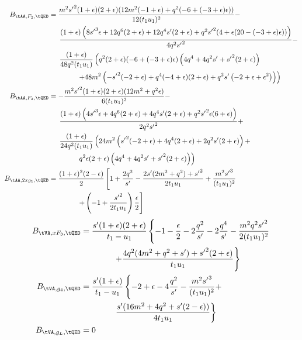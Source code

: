 \begin{align}
B_{\tAA,F_2,\tQED} &= \frac{{m^2} {s'}^2 (1+\epsilon ) (2+\epsilon ) (12 {m^2} (-1+\epsilon )+{q^2} (-6+(-3+\epsilon ) \epsilon ))}{12 (t_1 u_1)^2}-\nonumber\\
 &\hspace{15pt} \frac{(1+\epsilon ) \left(8 {s'}^3 \epsilon +12 {q^6} (2+\epsilon )+12 {q^4} {s'} (2+\epsilon )+{q^2} {s'}^2 (4+\epsilon  (20-(-3+\epsilon ) \epsilon ))\right)}{4 {q^2} {s'}^2}-\nonumber\\
 &\hspace{15pt}\frac{(1+\epsilon )}{48 {q^2} (t_1 u_1)}\left({q^2} (2+\epsilon ) (-6+(-3+\epsilon ) \epsilon ) \left(4 {q^4}+4 {q^2} {s'}+{s'}^2 (2+\epsilon )\right)\right.\nonumber\\
 &\hspace{40pt} \left. +48 {m^2} \left(-{s'}^2 (-2+\epsilon )+{q^4} (-4+\epsilon ) (2+\epsilon )+{q^2} {s'} \left(-2+\epsilon +\epsilon ^2\right)\right)\right)\\
B_{\tAA,F_2,\tQED} &= -\frac{{m^2} {s'}^2 (1+\epsilon ) (2+\epsilon ) (12 {m^2}+{q^2} \epsilon )}{6 (t_1 u_1)^2}-\nonumber\\
 &\hspace{15pt}\frac{(1+\epsilon ) \left(4 {s'}^3 \epsilon +4 {q^6} (2+\epsilon )+4 {q^4} {s'} (2+\epsilon )+{q^2} {s'}^2 \epsilon  (6+\epsilon )\right)}{2 {q^2} {s'}^2}+\nonumber\\
 &\hspace{15pt}\frac{(1+\epsilon )}{24 {q^2} (t_1 u_1)} \left(24 {m^2} \left({s'}^2 (-2+\epsilon )+4 {q^4} (2+\epsilon )+2 {q^2} {s'} (2+\epsilon )\right)+\right.\nonumber\\
 &\hspace{40pt} \left. {q^2} \epsilon  (2+\epsilon ) \left(4 {q^4}+4 {q^2} {s'}+{s'}^2 (2+\epsilon )\right)\right)\\
B_{\tAA,2xg_1,\tQED} &= \frac{(1+\epsilon)^2(2-\epsilon)}{2}\left[1+\frac{2q^2}{s'}-\frac{2s'(2m^2+q^2)+{s'}^2}{2t_1u_1} + \frac{m^2{s'}^3}{(t_1u_1)^2} \right.\nonumber\\
&\hspace{40pt}\left. + \left(-1+\frac{{s'}^2}{2t_1u_1}\right)\frac{\epsilon}{2}\right]
\end{align}
\begin{align}
B_{\tVA,xF_3,\tQED} &= \frac{s'(1+\epsilon)(2+\epsilon)}{t_1-u_1}\left\{-1-\frac{\epsilon}{2}-2\frac{q^2}{{s'}} - 2\frac{q^4}{{s'}}- \frac{m^2q^2{s'}^2}{2(t_1u_1)^2} \right.\nonumber\\
 &\hspace{40pt}\left. + \frac{4q^2(4m^2+q^2+s')+{s'}^2(2+\epsilon)}{t_1 u_1}\right\}\\
B_{\tVA,g_4,\tQED} &= \frac{s'(1+\epsilon)}{t_1-u_1}\left\{-2+\epsilon - 4\frac{q^2}{s'} - \frac{m^2{s'}^3}{(t_1u_1)^2} + \right.\nonumber\\
 &\hspace{40pt}\left. \frac{s'(16m^2 + 4q^2 + s'(2-\epsilon))}{4 t_1 u_1} \right\}\\
B_{\tVA,g_L,\tQED} &= 0
\end{align}
